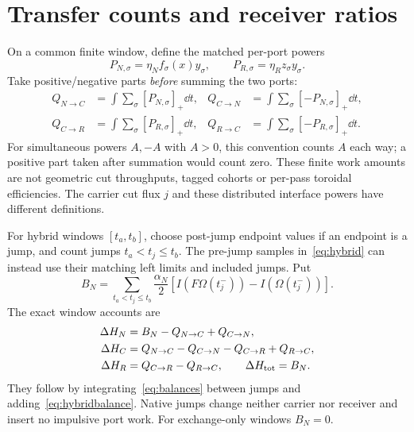 \section{Transfer counts and receiver ratios}\label{sec:accounts}
On a common finite window, define the matched per-port powers
\begin{equation}\label{eq:perport}
 P_{N,\sigma}=\eta_N f_\sigma(x)y_\sigma,\qquad
 P_{R,\sigma}=\eta_R z_\sigma y_\sigma.
\end{equation}
Take positive/negative parts \emph{before} summing the two ports:
\begin{equation}\label{eq:Qdefinitions}
\begin{aligned}
 Q_{N\to C}&=\int\sum_\sigma[P_{N,\sigma}]_+\dd t,&
 Q_{C\to N}&=\int\sum_\sigma[-P_{N,\sigma}]_+\dd t,\\
 Q_{C\to R}&=\int\sum_\sigma[P_{R,\sigma}]_+\dd t,&
 Q_{R\to C}&=\int\sum_\sigma[-P_{R,\sigma}]_+\dd t.
\end{aligned}
\end{equation}
For simultaneous powers $A,-A$ with $A>0$, this convention counts $A$ each way; a positive part taken after summation would count zero. These finite work amounts are not geometric cut throughputs, tagged cohorts or per-pass toroidal efficiencies. The carrier cut flux $j$ and these distributed interface powers have different definitions.~\cite{recirculation}

For hybrid windows $[t_a,t_b]$, choose post-jump endpoint values if an endpoint is a jump, and count jumps $t_a<t_j\le t_b$. The pre-jump samples in~\eqref{eq:hybrid} can instead use their matching left limits and included jumps. Put
\begin{equation}\label{eq:baselinewindow}
 B_N=\sum_{t_a<t_j\le t_b}\frac{\alpha_N}{2}
       [I(F\Omega(t_j^-))-I(\Omega(t_j^-))].
\end{equation}
The exact window accounts are
\begin{equation}\label{eq:windowbalances}
\begin{aligned}
 \Delta H_N&=B_N-Q_{N\to C}+Q_{C\to N},\\
 \Delta H_C&=Q_{N\to C}-Q_{C\to N}-Q_{C\to R}+Q_{R\to C},\\
 \Delta H_R&=Q_{C\to R}-Q_{R\to C},\qquad
 \Delta H_{\rm tot}=B_N.
\end{aligned}
\end{equation}
They follow by integrating~\eqref{eq:balances} between jumps and adding~\eqref{eq:hybridbalance}. Native jumps change neither carrier nor receiver and insert no impulsive port work. For exchange-only windows $B_N=0$.


